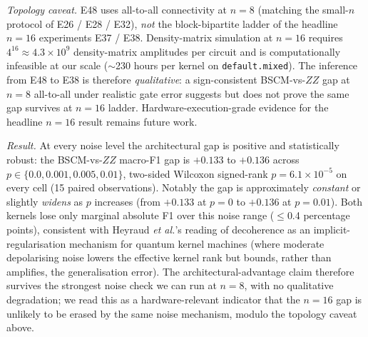 \documentclass[pdflatex,sn-mathphys]{sn-jnl}
\theoremstyle{plain}
\theoremstyle{remark}
\theoremstyle{definition}
\begin{document}
\noindent\emph{Topology caveat.} E48 uses all-to-all connectivity at $n=8$ (matching the small-$n$ protocol of E26 / E28 / E32), \emph{not} the block-bipartite ladder of the headline $n=16$ experiments E37 / E38.  Density-matrix simulation at $n=16$ requires $4^{16}\!\approx\!4.3\times 10^{9}$ density-matrix amplitudes per circuit and is computationally infeasible at our scale ($\sim$230 hours per kernel on \texttt{default.mixed}).  The inference from E48 to E38 is therefore \emph{qualitative}: a sign-consistent BSCM-vs-$ZZ$ gap at $n=8$ all-to-all under realistic gate error suggests but does not prove the same gap survives at $n=16$ ladder.  Hardware-execution-grade evidence for the headline $n=16$ result remains future work.

\noindent\emph{Result.}  At every noise level the architectural gap is positive and statistically robust: the BSCM-vs-$ZZ$ macro-F1 gap is $+0.133$ to $+0.136$ across $p \in \{0.0, 0.001, 0.005, 0.01\}$, two-sided Wilcoxon signed-rank $p\!=\!6.1\!\times\!10^{-5}$ on every cell (15 paired observations).  Notably the gap is approximately \emph{constant} or slightly \emph{widens} as $p$ increases (from $+0.133$ at $p=0$ to $+0.136$ at $p=0.01$).  Both kernels lose only marginal absolute F1 over this noise range ($\le$0.4 percentage points), consistent with Heyraud \emph{et al.}'s \cite{heyraud2022} reading of decoherence as an implicit-regularisation mechanism for quantum kernel machines (where moderate depolarising noise lowers the effective kernel rank but bounds, rather than amplifies, the generalisation error).  The architectural-advantage claim therefore survives the strongest noise check we can run at $n=8$, with no qualitative degradation; we read this as a hardware-relevant indicator that the $n=16$ gap is unlikely to be erased by the same noise mechanism, modulo the topology caveat above.
\end{document}
